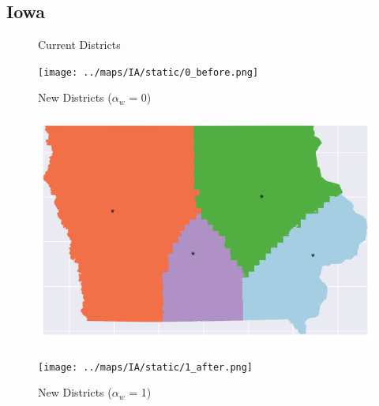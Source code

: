\subsection{Iowa}
\begin{figure}[htb!] \centering
\caption{ Current Districts }
\texttt{[image: ../maps/IA/static/0\_before.png]}
\caption{ New Districts ($\alpha_w$ = 0) }
\includegraphics[width=5in,height=3in,keepaspectratio]{../maps/IA/static/0_after.png}
\caption{ New Districts ($\alpha_w$ = 1) }
\texttt{[image: ../maps/IA/static/1\_after.png]}
\end{figure}

\clearpage
\newpage

